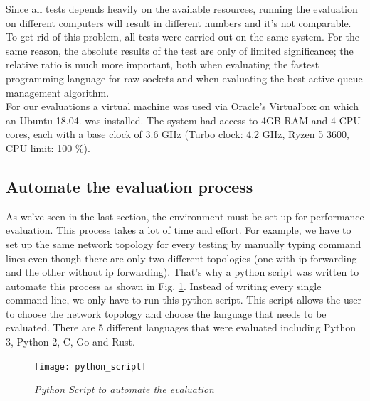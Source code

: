 Since all tests depends heavily on the available resources, running the evaluation on different computers will result in different numbers and it's not comparable. To get rid of this problem, all tests were carried out on the same system. For the same reason, the absolute results of the test are only of limited significance; the relative ratio is much more important, both when evaluating the fastest programming language for raw sockets and when evaluating the best active queue management algorithm.\\
For our evaluations a virtual machine was used via Oracle's Virtualbox on which an Ubuntu 18.04. was installed. The system had access to 4GB RAM and 4 CPU cores, each with a base clock of 3.6 GHz (Turbo clock: 4.2 GHz, Ryzen 5 3600, CPU limit: 100 \%).\\
\subsection{Automate the evaluation process}
As we've seen in the last section, the environment must be set up for performance evaluation. This process takes a lot of time and effort. For example, we have to set up the same network topology for every testing by manually typing command lines even though there are only two different topologies (one with ip forwarding and the other without ip forwarding). That's why a python script was written to automate this process as shown in Fig. \ref{fig:python_script}. Instead of writing every single command line, we only have to run this python script. This script allows the user to choose the network topology and choose the language that needs to be evaluated. There are 5 different languages that were evaluated including Python 3, Python 2, C, Go and Rust. 

\begin{figure}[htbp]
\centering
\texttt{[image: python\_script]}
\caption{\em Python Script to automate the evaluation}
\label{fig:python_script}
\end{figure}

